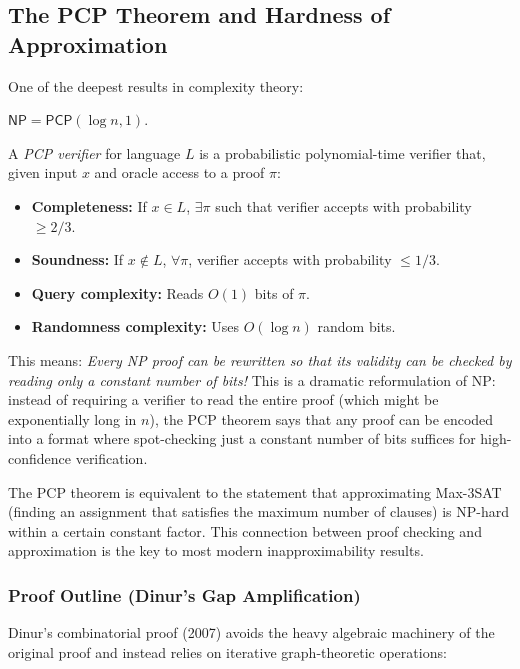 \subsection{The PCP Theorem and Hardness of Approximation}
\label{sec:np:pcp}

One of the deepest results in complexity theory:

\begin{theorem}
$\mathsf{NP} = \mathsf{PCP}(\log n, 1)$.
\end{theorem}

A \emph{PCP verifier} for language $L$ is a probabilistic polynomial-time verifier that, given input $x$ and oracle access to a proof $\pi$:
\begin{itemize}
\item \textbf{Completeness:} If $x \in L$, $\exists \pi$ such that verifier accepts with probability $\ge 2/3$.
\item \textbf{Soundness:} If $x \notin L$, $\forall \pi$, verifier accepts with probability $\le 1/3$.
\item \textbf{Query complexity:} Reads $O(1)$ bits of $\pi$.
\item \textbf{Randomness complexity:} Uses $O(\log n)$ random bits.
\end{itemize}

This means: \emph{Every NP proof can be rewritten so that its validity can be checked by reading only a constant number of bits!} This is a dramatic reformulation of NP: instead of requiring a verifier to read the entire proof (which might be exponentially long in $n$), the PCP theorem says that any proof can be encoded into a format where spot-checking just a constant number of bits suffices for high-confidence verification.

The PCP theorem is equivalent to the statement that approximating Max-3SAT (finding an assignment that satisfies the maximum number of clauses) is NP-hard within a certain constant factor. This connection between proof checking and approximation is the key to most modern inapproximability results.

\subsubsection*{Proof Outline (Dinur's Gap Amplification)}

Dinur's combinatorial proof (2007) avoids the heavy algebraic machinery of the original proof and instead relies on iterative graph-theoretic operations:

